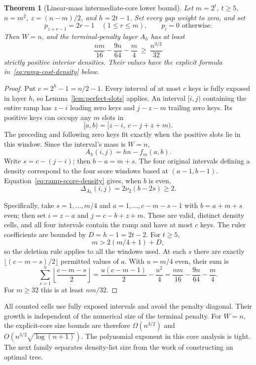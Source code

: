 \documentclass[11pt]{article}
\newtheorem{theorem}{Theorem}
\begin{document}
\begin{theorem}[Linear-mass intermediate-core lower bound]
\label{thm:ramp-core-lower}
Let $m=2^t$, $t\ge5$, $n=m^2$, $z=(n-m)/2$, and $h=2t-1$.
Set every gap weight to zero, and set
\[
 p_{z+r-1}=2r-1\quad(1\le r\le m),\qquad p_i=0\text{ otherwise}.
\]
Then $W=n$, and the terminal-penalty layer $A_h$ has at least
\[
 \frac{nm}{16}-\frac{9n}{64}-\frac m4
       \ \ge\ \frac{n^{3/2}}{32}
\]
strictly positive interior densities. Their values have the explicit formula
in~\eqref{eq:ramp-cost-density} below.
\end{theorem}
\begin{proof}
Put $c=2^h-1=n/2-1$. Every interval of at most $c$ keys is fully exposed
in layer $h$, so Lemma~\ref{lem:perfect-slots} applies. An interval
$[i,j)$ containing the entire ramp has $z-i$ leading zero keys and
$j-z-m$ trailing zero keys. Its positive keys can occupy any $m$ slots in
\[
 [a,b)=[z-i,\ c-j+z+m).
\]
The preceding and following zero keys fit exactly when the positive slots
lie in this window. Since the interval's mass is $W=n$,
\[
 A_h(i,j)=hn-f_m(a,b).
\]
Write $s=c-(j-i)$; then $b-a=m+s$.
The four original intervals defining a density correspond to the four score
windows based at $(a-1,b-1)$. Equation~\eqref{eq:ramp-score-density} gives,
when $b$ is even,
\begin{equation}\label{eq:ramp-cost-density}
 \Delta_{A_h}(i,j)=2\nu_2(b-2s)\ge2.
\end{equation}

Specifically, take $s=1,\ldots,m/4$ and
$a=1,\ldots,c-m-s-1$ with $b=a+m+s$ even; then set
$i=z-a$ and $j=c-b+z+m$. These are valid, distinct density cells, and
all four intervals contain the ramp and have at most $c$ keys. The ruler
coefficients are bounded by $D=h-1=2t-2$. For $t\ge5$,
\[
 m>2(m/4+1)+D,
\]
so the deletion rule applies to all the windows used.
At each $s$ there are exactly $\lfloor(c-m-s)/2\rfloor$ permitted values
of $a$. With $u=m/4$ even, their sum is
\[
 \sum_{s=1}^{u}\left\lfloor\frac{c-m-s}{2}\right\rfloor
 =\frac{u(c-m-1)}2-\frac{u^2}4
 =\frac{nm}{16}-\frac{9n}{64}-\frac m4.
\]
For $m\ge32$ this is at least $nm/32$.
\end{proof}

All counted cells use fully exposed intervals and avoid the penalty diagonal.
Their growth is independent of the numerical size of the terminal penalty.
For $W=n$, the explicit-core size bounds are therefore
$\Omega(n^{3/2})$ and $O(n^{3/2}\sqrt{\log(n+1)})$.
The polynomial exponent in this core analysis is tight. The next family
separates density-list size from the work of constructing an optimal tree.
\end{document}

